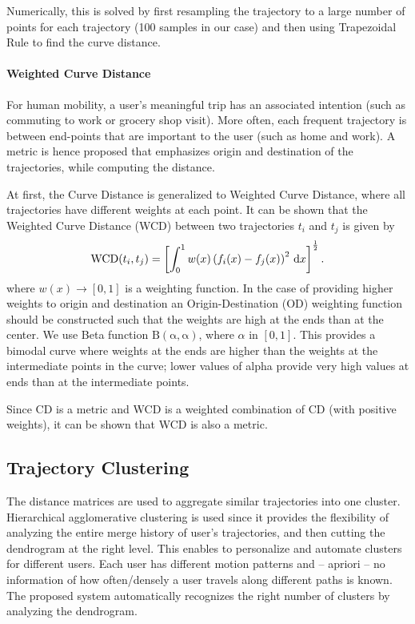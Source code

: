 Numerically, this is solved by first resampling the trajectory to a large number of points for each trajectory (100 samples in our case) and then using Trapezoidal Rule to find the curve distance. %

\paragraph{Weighted Curve Distance} For human mobility, a user's meaningful trip has an associated intention (such as commuting to work or grocery shop visit). More often, each frequent trajectory is between end-points that are important to the user (such as home and work). A metric is hence proposed that emphasizes origin and destination of the trajectories, while computing the distance. 

At first, the Curve Distance is generalized to Weighted Curve Distance, where all trajectories have different weights at each point.  It can be shown that the Weighted Curve Distance (WCD) between two trajectories $t_i$ and $t_j$ is given by
\begin{align}
\operatorname{WCD}(t_i,t_j) = \left[ \int_{0}^{1}{ w(x) \left( f_i(x) - f_j(x) \right )^2\, \mathrm{d}x }\right] ^ {\frac{1}{2}}.
\end{align}
\noindent where $w(x) \rightarrow [0,1]$ is a weighting function. In the case of providing higher weights to origin and destination an Origin-Destination (OD) weighting function should be constructed such that the weights are high at the ends than at the center. We use Beta function $\operatorname{B(\alpha,\alpha)}$, where $\alpha$ in $[0,1]$. This provides a bimodal curve where weights at the ends are higher than the weights at the intermediate points in the curve; lower values of alpha provide very high values at ends than at the intermediate points.

Since CD is a metric and WCD is a weighted combination of CD (with positive weights), it can be shown that WCD is also a metric.




\subsection{Trajectory Clustering}
The distance matrices are used to aggregate similar trajectories into one cluster. Hierarchical agglomerative clustering is used since it provides the flexibility of analyzing the entire merge history of user's trajectories, and then cutting the dendrogram at the right level. This enables to personalize and automate clusters for different users. Each user has different motion patterns and -- apriori -- no information of how often/densely a user travels along different paths is known. The proposed system automatically recognizes the right number of clusters by analyzing the dendrogram.

